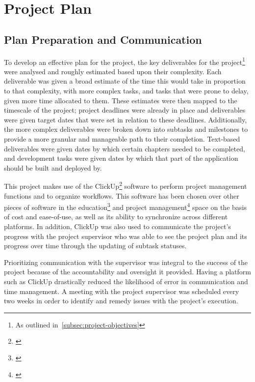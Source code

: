 
\thispagestyle{plain}
\newpage
\section{Project Plan}\label{sec:project-plan}

\normalsize

\subsection{Plan Preparation and Communication}\label{subsec:plan-preparation-and-communication}

To develop an effective plan for the project, the key deliverables for the project\footnote{As outlined in~\ref{subsec:project-objectives}} were analysed and roughly estimated based upon their complexity.
Each deliverable was given a broad estimate of the time this would take in proportion to that complexity, with more complex tasks, and tasks that were prone to delay, given more time allocated to them.
These estimates were then mapped to the timescale of the project;
project deadlines were already in place and deliverables were given target dates that were set in relation to these deadlines.
Additionally, the more complex deliverables were broken down into subtasks and milestones to provide a more granular and manageable path to their completion.
Text-based deliverables were given dates by which certain chapters needed to be completed, and development tasks were given dates by which that part of the application should be built and deployed by.

This project makes use of the ClickUp\footnote{\citep{clickup}} software to perform project management functions and to organize workflows.
This software has been chosen over other pieces of software in the education\footnote{\citep{education_software}} and project management\footnote{\citep{pm_software}} space on the basis of cost and ease-of-use, as well as its ability to synchronize across different platforms.
In addition, ClickUp was also used to communicate the project's progress with the project supervisor who was able to see the project plan and its progress over time through the updating of subtask statuses.

Prioritizing communication with the supervisor was integral to the success of the project because of the accountability and oversight it provided.
Having a platform such as ClickUp drastically reduced the likelihood of error in communication and time management.
A meeting with the project supervisor was scheduled every two weeks in order to identify and remedy issues with the project's execution.

